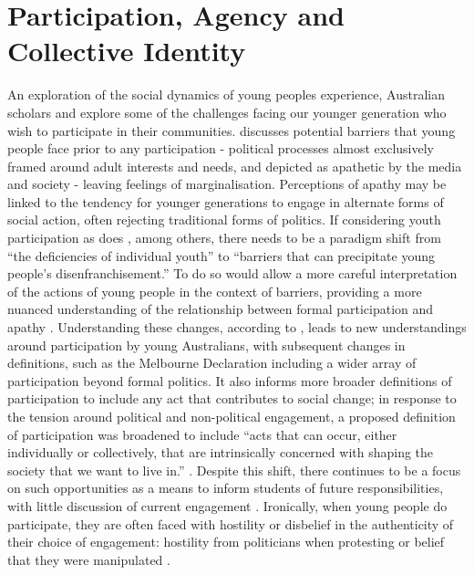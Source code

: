 \section{Participation, Agency and Collective Identity}
\label{ParticipateAgencyCollectiveIdentity}
An exploration of the social dynamics of young peoples experience, Australian scholars \citet{Harris2010} and \citet{White2008} explore some of the challenges facing our younger generation who wish to participate in their communities. \citet{Harris2010} discusses potential barriers that young people face prior to any participation - political processes almost exclusively framed around adult interests and needs, and depicted as apathetic by the media and society - leaving feelings of marginalisation. Perceptions of apathy may be linked to the tendency for younger generations to engage in alternate forms of social action, often rejecting traditional forms of politics. If considering youth participation as does \citet[][p539]{Edwards2007}, among others, there needs to be a paradigm shift from “the deficiencies of individual youth” to “barriers that can precipitate young people’s disenfranchisement.” To do so would allow a more careful interpretation of the actions of young people in the context of barriers, providing a more nuanced understanding of the relationship between formal participation and apathy \citep{Harris2010}. Understanding these changes, according to \citet{Harris2010}, leads to new understandings around participation by young Australians, with subsequent changes in definitions, such as the Melbourne Declaration including a wider array of participation beyond formal politics. It also informs more broader definitions of participation to include any act that contributes to social change; in response to the tension around political and non-political engagement, a proposed definition of participation was broadened to include “acts that can occur, either individually or collectively, that are intrinsically concerned with shaping the society that we want to live in.” \citep[][p82-83]{Vromen2003}. Despite this shift, there continues to be a focus on such opportunities as a means to inform students of future responsibilities, with little discussion of current engagement \citep[][p109]{White2008}. Ironically, when young people do participate, they are often faced with hostility or disbelief in the authenticity of their choice of engagement: hostility from politicians when protesting or belief that they were manipulated \citep[][p110]{White2008}. 


